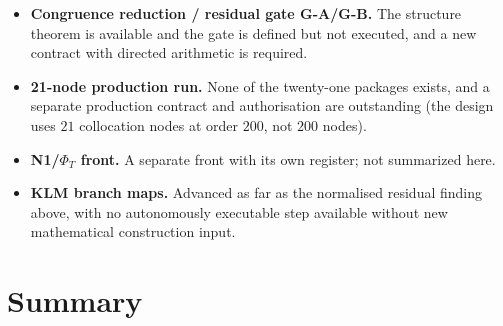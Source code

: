 \documentclass[12pt,a4paper]{article}
\theoremstyle{definition}
\theoremstyle{remark}
\begin{document}
\begin{itemize}
  \item \textbf{Congruence reduction / residual gate G-A/G-B.} The
    structure theorem is available and the gate is defined but not
    executed, and a new contract with directed arithmetic is required.
  \item \textbf{21-node production run.} None of the twenty-one packages
    exists, and a separate production contract and authorisation are
    outstanding (the design uses $21$ collocation nodes at order $200$, not
    $200$ nodes).
  \item \textbf{N1/$\Phi_T$ front.} A separate front with its own register;
    not summarized here.
  \item \textbf{KLM branch maps.} Advanced as far as the normalised
    residual finding above, with no autonomously executable step available
    without new mathematical construction input.
\end{itemize}


\section{Summary}
\label{sec:summary}
\end{document}
